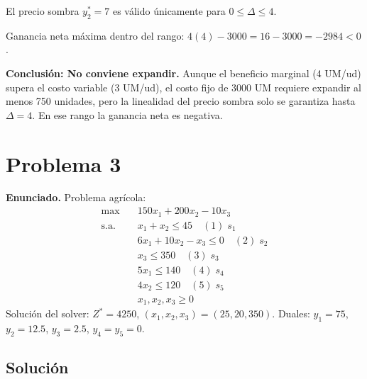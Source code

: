 \documentclass{article}
\begin{document}
\begin{enumerate}[a)]
El precio sombra $y_2^*=7$ es válido únicamente para $0\leq\Delta\leq4$.

Ganancia neta máxima dentro del rango: $4(4)-3000=16-3000=-2984<0$.

\textbf{Conclusión: No conviene expandir.} Aunque el beneficio marginal (4 UM/ud) supera el costo variable (3 UM/ud), el costo fijo de 3000 UM requiere expandir al menos 750 unidades, pero la linealidad del precio sombra solo se garantiza hasta $\Delta=4$. En ese rango la ganancia neta es negativa.

\end{enumerate}

\newpage
\section*{Problema 3}

\textbf{Enunciado.} Problema agrícola:
$$\begin{aligned}
\max\quad & 150x_1+200x_2-10x_3 \\
\text{s.a.}\quad
& x_1+x_2\leq45\quad(1)\;s_1\\
& 6x_1+10x_2-x_3\leq0\quad(2)\;s_2\\
& x_3\leq350\quad(3)\;s_3\\
& 5x_1\leq140\quad(4)\;s_4\\
& 4x_2\leq120\quad(5)\;s_5\\
&x_1,x_2,x_3\geq0
\end{aligned}$$
Solución del solver: $Z^*=4250$, $(x_1,x_2,x_3)=(25,20,350)$. Duales: $y_1=75$, $y_2=12.5$, $y_3=2.5$, $y_4=y_5=0$.

\subsection*{Solución}
\end{document}
